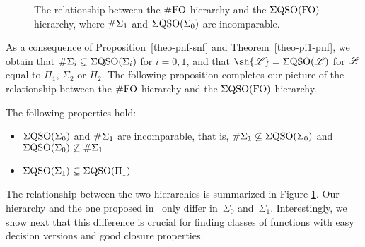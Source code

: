 \begin{figure*}
\begin{center}
\end{center}
\vspace{-0.4cm}
\caption{The relationship between the $\#{\rm FO}$-hierarchy and the $\Sigma{\rm QSO}({\rm FO})$-hierarchy, where $\#\Sigma_{1}$ and $\Sigma{\rm QSO}(\Sigma_{0})$ are incomparable. \label{fig-sfo-eqso}}
\end{figure*}

As a consequence of Proposition~\ref{theo-pnf-snf} and Theorem~\ref{theo-pi1-pnf}, we obtain that $\#\Sigma_{i} \subsetneq \Sigma{\rm QSO}(\Sigma_{i})$ for $i = 0,1$, and that $\sh{\LL} = \eqso(\LL)$ for $\mathscr{L}$ equal to  $\Pi_1$, $\Sigma_2$ or $\Pi_2$. The following proposition completes our picture of the relationship between the $\#{\rm FO}$-hierarchy and the $\Sigma{\rm QSO}({\rm FO})$-hierarchy.
\begin{proposition}\label{prop-rest}
The following properties hold:
\begin{itemize}
\item $\Sigma{\rm QSO}(\Sigma_{0})$ and $\#\Sigma_{1}$ are incomparable, that is, $\#\Sigma_{1} \not\subseteq \Sigma{\rm QSO}(\Sigma_{0})$ and $\Sigma{\rm QSO}(\Sigma_{0}) \not\subseteq \#\Sigma_{1}$
\item $\Sigma{\rm QSO}(\Sigma_{1}) \subsetneq \Sigma{\rm QSO}(\Pi_{1})$
\end{itemize}
\end{proposition}
The relationship between the two hierarchies is summarized in Figure \ref{fig-sfo-eqso}.
Our hierarchy and the one proposed in~\cite{SalujaST95} only differ in~$\Sigma_0$ and~$\Sigma_1$. 
Interestingly, we show next that this difference is crucial for finding classes of functions with easy decision versions and good closure properties.

 
